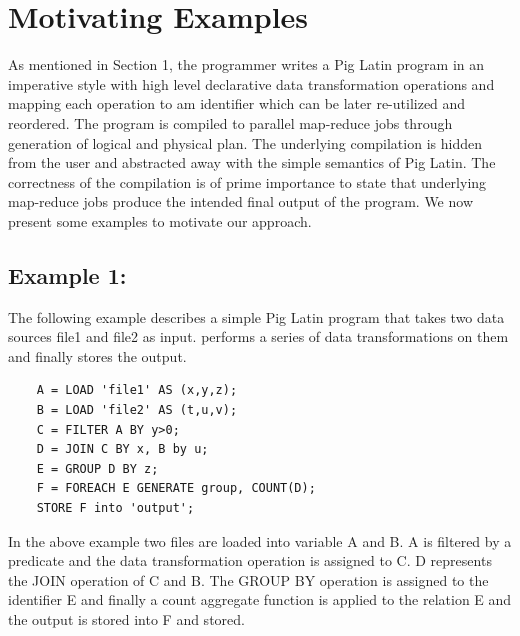 \section{Motivating Examples}
\label{sec:motivation}

As mentioned in Section 1, the programmer writes a Pig Latin program in an imperative style with high level declarative data transformation operations and mapping each operation to am identifier which can be later re-utilized and reordered. The program is compiled to parallel map-reduce jobs through generation of logical and physical plan. The underlying compilation is hidden from the user and abstracted away with the simple semantics of Pig Latin. The correctness of the compilation is of prime importance to state that underlying map-reduce jobs produce the intended final output of the program.
We now present some examples to motivate our approach.

\subsection{Example 1:}
\label{subsec:example1}

The following example\cite{gates2009building} describes a simple Pig Latin program that takes two data sources file1 and file2 as input. performs a series of data transformations on them and finally stores the output.
\begin{lstlisting}
	A = LOAD 'file1' AS (x,y,z);
	B = LOAD 'file2' AS (t,u,v);
	C = FILTER A BY y>0; 
	D = JOIN C BY x, B by u;
	E = GROUP D BY z;
	F = FOREACH E GENERATE group, COUNT(D);
	STORE F into 'output';
\end{lstlisting}

In the above example two files are loaded into variable A and B. A is filtered by a predicate and the data transformation operation is assigned to C. D represents the JOIN operation of C and B. The GROUP BY operation is assigned to the identifier E and finally a count aggregate function is applied to the relation E and the output is stored into F and stored.

